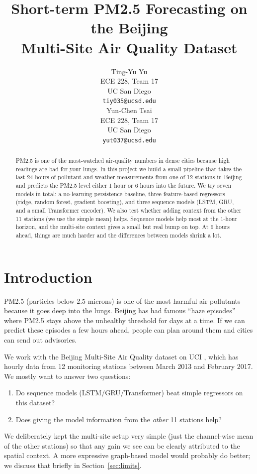 \documentclass{article}
\title{Short-term PM2.5 Forecasting on the Beijing\\Multi-Site Air Quality Dataset}
\author{%
  Ting-Yu Yu\\
  ECE 228, Team 17\\
  UC San Diego\\
  \texttt{tiy035@ucsd.edu}\\
  \And
  Yun-Chen Tsai\\
  ECE 228, Team 17\\
  UC San Diego\\
  \texttt{yut037@ucsd.edu}\\
}
\begin{document}
\maketitle

\begin{abstract}
PM2.5 is one of the most-watched air-quality numbers in dense cities
because high readings are bad for your lungs. In this project we build a
small pipeline that takes the last 24 hours of pollutant and weather
measurements from one of 12 stations in Beijing and predicts the PM2.5
level either 1 hour or 6 hours into the future. We try seven models in
total: a no-learning persistence baseline, three feature-based
regressors (ridge, random forest, gradient boosting), and three sequence
models (LSTM, GRU, and a small Transformer encoder). We also test
whether adding context from the other 11 stations (we use the simple
mean) helps. Sequence models help most at the 1-hour horizon, and the
multi-site context gives a small but real bump on top. At 6 hours
ahead, things are much harder and the differences between models shrink
a lot.
\end{abstract}

\section{Introduction}

PM2.5 (particles below 2.5 microns) is one of the most harmful air
pollutants because it goes deep into the lungs. Beijing has had famous
``haze episodes'' where PM2.5 stays above the unhealthy threshold for
days at a time. If we can predict these episodes a few hours ahead,
people can plan around them and cities can send out advisories.

We work with the Beijing Multi-Site Air Quality dataset on UCI
\cite{Zhang2017uci}, which has hourly data from 12 monitoring stations
between March 2013 and February 2017. We mostly want to answer two
questions:

\begin{enumerate}[leftmargin=*, itemsep=2pt]
  \item Do sequence models (LSTM/GRU/Transformer) beat simple regressors
    on this dataset?
  \item Does giving the model information from the \emph{other} 11
    stations help?
\end{enumerate}

We deliberately kept the multi-site setup very simple (just the
channel-wise mean of the other stations) so that any gain we see can be
clearly attributed to the spatial context. A more expressive
graph-based model would probably do better; we discuss that briefly in
Section~\ref{sec:limits}.
\end{document}
